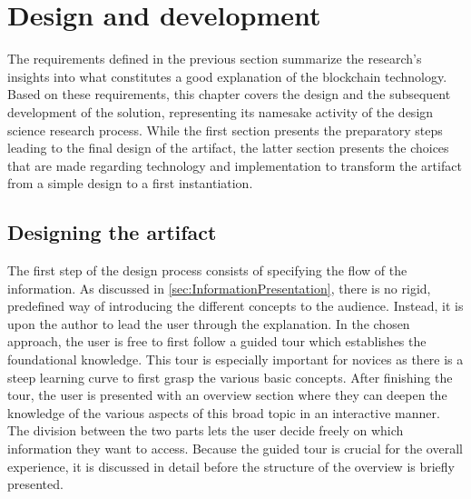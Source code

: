 \chapter{Design and development} \label{chap:designanddev}
The requirements defined in the previous section summarize the research's insights into what constitutes a good explanation of the blockchain technology. Based on these requirements, this chapter covers the design and the subsequent development of the solution, representing its namesake activity of the design science research process. While the first section presents the preparatory steps leading to the final design of the artifact, the latter section presents the choices that are made regarding technology and implementation to transform the artifact from a simple design to a first instantiation.

\section{Designing the artifact} \label{sec:ArtifactDesign}
The first step of the design process consists of specifying the flow of the information. As discussed in \ref{sec:InformationPresentation}, there is no rigid, predefined way of introducing the different concepts to the audience. Instead, it is upon the author to lead the user through the explanation. In the chosen approach, the user is free to first follow a guided tour which establishes the foundational knowledge. This tour is especially important for novices as there is a steep learning curve to first grasp the various basic concepts. After finishing the tour, the user is presented with an overview section where they can deepen the knowledge of the various aspects of this broad topic in an interactive manner. The division between the two parts lets the user decide freely on which information they want to access. Because the guided tour is crucial for the overall experience, it is discussed in detail before the structure of the overview is briefly presented.

